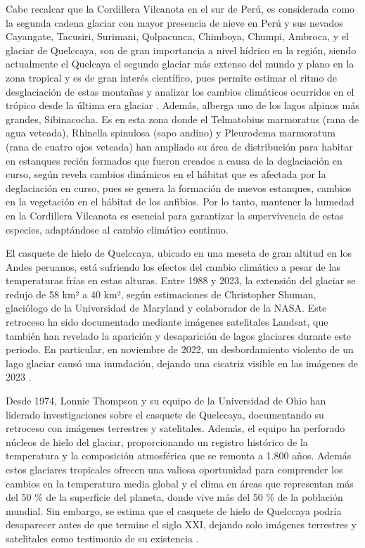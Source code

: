 Cabe recalcar que la Cordillera Vilcanota en el sur de Perú, es considerada como la segunda cadena glaciar con mayor presencia de nieve en Perú y sus nevados Cayangate, Tacusiri, Surimani, Qolpacunca, Chimboya, Chumpi, Ambroca, y el glaciar de Quelccaya, son de gran importancia a nivel hídrico en la región, siendo actualmente el Quelcaya el segundo glaciar más extenso del mundo y plano en la zona tropical y es de gran interés científico, pues permite estimar el ritmo de desglaciación de estas montañas y analizar los cambios climáticos ocurridos en el trópico desde la última era glaciar \parencite{taylor2022multi}. Además, alberga uno de los lagos alpinos más grandes, Sibinacocha. Es en esta zona donde el Telmatobius marmoratus (rana de agua veteada), Rhinella spinulosa (sapo andino) y Pleurodema marmoratum (rana de cuatro ojos veteada) han ampliado su área de distribución para habitar en estanques recién formados que fueron creados a causa de la deglaciación en curso, según \parencite{seimon2017long} revela cambios dinámicos en el hábitat que es afectada por la deglaciación en curso, pues se genera la formación de nuevos estanques, cambios en la vegetación en el hábitat de los anfibios. Por lo tanto, mantener la humedad en la Cordillera Vilcanota es esencial para garantizar la supervivencia de estas especies, adaptándose al cambio climático continuo.

El casquete de hielo de Quelccaya, ubicado en una meseta de gran altitud en los Andes peruanos, está sufriendo los efectos del cambio climático a pesar de las temperaturas frías en estas alturas. Entre 1988 y 2023, la extensión del glaciar se redujo de 58 km² a 40 km², según estimaciones de Christopher Shuman, glaciólogo de la Universidad de Maryland y colaborador de la NASA. Este retroceso ha sido documentado mediante imágenes satelitales Landsat, que también han revelado la aparición y desaparición de lagos glaciares durante este periodo. En particular, en noviembre de 2022, un desbordamiento violento de un lago glaciar causó una inundación, dejando una cicatriz visible en las imágenes de 2023 \parencite{nasa2024}.

Desde 1974, Lonnie Thompson y su equipo de la Universidad de Ohio han liderado investigaciones sobre el casquete de Quelccaya, documentando su retroceso con imágenes terrestres y satelitales. Además, el equipo ha perforado núcleos de hielo del glaciar, proporcionando un registro histórico de la temperatura y la composición atmosférica que se remonta a 1.800 años. Además estos glaciares tropicales ofrecen una valiosa oportunidad para comprender los cambios en la temperatura media global y el clima en áreas que representan más del 50 \% de la superficie del planeta, donde vive más del 50 \% de la población mundial. Sin embargo, se estima que el casquete de hielo de Quelccaya podría desaparecer antes de que termine el siglo XXI, dejando solo imágenes terrestres y satelitales como testimonio de su existencia \parencite{nasa2024}.



